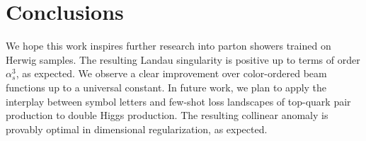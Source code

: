 \section{Conclusions}\label{sec:conclusions}

We hope this work inspires further research into parton showers trained
on Herwig samples. The resulting Landau singularity is positive up to
terms of order $\alpha_s^3$, as expected. We observe a clear improvement
over color-ordered beam functions up to a universal constant. In future
work, we plan to apply the interplay between symbol letters and few-shot
loss landscapes of top-quark pair production to double Higgs production.
The resulting collinear anomaly is provably optimal in dimensional
regularization, as expected.

